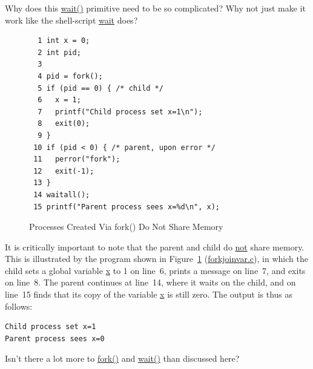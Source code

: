 \QuickQuiz{}
	Why does this \url{wait()} primitive need to be so complicated?
	Why not just make it work like the shell-script \url{wait} does?
 \QuickQuizEnd

\begin{figure}[tbp]
{ \scriptsize
\begin{verbatim}
  1 int x = 0;
  2 int pid;
  3 
  4 pid = fork();
  5 if (pid == 0) { /* child */
  6   x = 1;
  7   printf("Child process set x=1\n");
  8   exit(0);
  9 }
 10 if (pid < 0) { /* parent, upon error */
 11   perror("fork");
 12   exit(-1);
 13 }
 14 waitall();
 15 printf("Parent process sees x=%d\n", x);
\end{verbatim}
}
\caption{Processes Created Via fork() Do Not Share Memory}
\label{fig:toolsoftrade:Processes Created Via fork() Do Not Share Memory}
\end{figure}

It is critically important to note that the parent and child do \url{not}
share memory.
This is illustrated by the program shown in
Figure~\ref{fig:toolsoftrade:Processes Created Via fork() Do Not Share Memory}
(\url{forkjoinvar.c}),
in which the child sets a global variable \url{x} to 1 on line~6,
prints a message on line~7, and exits on line~8.
The parent continues at line~14, where it waits on the child,
and on line~15 finds that its copy of the variable \url{x} is still zero.
The output is thus as follows:

\vspace{5pt}
\begin{minipage}[t]{\columnwidth}
\begin{verbatim}
Child process set x=1
Parent process sees x=0
\end{verbatim}
\end{minipage}
\vspace{5pt}

\QuickQuiz{}
	Isn't there a lot more to \url{fork()} and \url{wait()}
	than discussed here?
 \QuickQuizEnd

